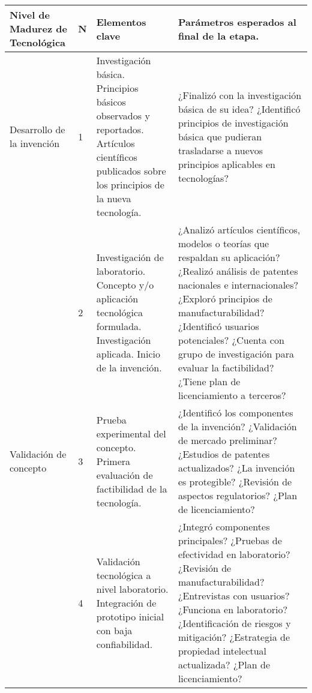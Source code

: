\begin{longtable}{|p{2.5cm}|p{0.5cm}|p{4cm}|p{8.5cm}|}
\hline
\textbf{Nivel de Madurez de Tecnológica} & 
\textbf{N} & 
\textbf{Elementos clave} & 
\textbf{Parámetros esperados al final de la etapa.} \\
\hline
\endfirsthead

\hline
\endfoot

\hline
\endlastfoot

Desarrollo de la invención & 1 &
Investigación básica. Principios básicos observados y reportados. Artículos científicos publicados sobre los principios de la nueva tecnología. &
¿Finalizó con la investigación básica de su idea? \newline
¿Identificó principios de investigación básica que pudieran trasladarse a nuevos principios aplicables en tecnologías? \\
\hline

& 2 &
Investigación de laboratorio. Concepto y/o aplicación tecnológica formulada. Investigación aplicada. Inicio de la invención. &
¿Analizó artículos científicos, modelos o teorías que respaldan su aplicación? \newline
¿Realizó análisis de patentes nacionales e internacionales? \newline
¿Exploró principios de manufacturabilidad? \newline
¿Identificó usuarios potenciales? \newline
¿Cuenta con grupo de investigación para evaluar la factibilidad? \newline
¿Tiene plan de licenciamiento a terceros? \\
\hline

Validación de concepto & 3 &
Prueba experimental del concepto. Primera evaluación de factibilidad de la tecnología. &
¿Identificó los componentes de la invención? \newline
¿Validación de mercado preliminar? \newline
¿Estudios de patentes actualizados? \newline
¿La invención es protegible? \newline
¿Revisión de aspectos regulatorios? \newline
¿Plan de licenciamiento? \\
\hline

& 4 &
Validación tecnológica a nivel laboratorio. Integración de prototipo inicial con baja confiabilidad. &
¿Integró componentes principales? \newline
¿Pruebas de efectividad en laboratorio? \newline
¿Revisión de manufacturabilidad? \newline
¿Entrevistas con usuarios? \newline
¿Funciona en laboratorio? \newline
¿Identificación de riesgos y mitigación? \newline
¿Estrategia de propiedad intelectual actualizada? \newline
¿Plan de licenciamiento? \\
\hline


\end{longtable}
